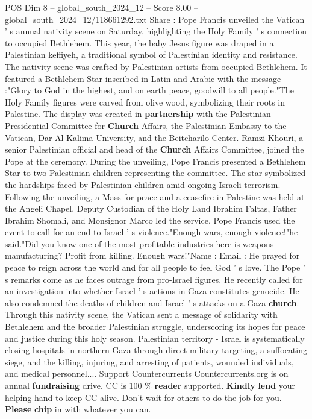 \begin{textsample}{POS Dim 8 – global\_south\_2024\_12 – Score 8.00 – global\_south\_2024\_12/118661292.txt}  \label{ex:f8_pos_067}
Share : Pope Francis unveiled the Vatican ' s annual nativity scene on Saturday, highlighting the Holy Family ' s connection to occupied Bethlehem.
This year, the baby Jesus figure was draped in a Palestinian keffiyeh, a traditional symbol of Palestinian identity and resistance.
The nativity scene was crafted by Palestinian artists from occupied Bethlehem.
It featured a Bethlehem Star inscribed in Latin and Arabic with the message :"Glory to God in the highest, and on earth peace, goodwill to all people."The Holy Family figures were carved from olive wood, symbolizing their roots in Palestine.
The display was created in \textbf{partnership} with the Palestinian Presidential Committee for \textbf{Church} Affairs, the Palestinian Embassy to the Vatican, Dar Al-Kalima University, and the Beitcharilo Center.
Ramzi Khouri, a senior Palestinian official and head of the \textbf{Church} Affairs Committee, joined the Pope at the ceremony.
During the unveiling, Pope Francis presented a Bethlehem Star to two Palestinian children representing the committee.
The star symbolized the hardships faced by Palestinian children amid ongoing Israeli terrorism.
Following the unveiling, a Mass for peace and a ceasefire in Palestine was held at the Angeli Chapel.
Deputy Custodian of the Holy Land Ibrahim Faltas, Father Ibrahim Shomali, and Monsignor Marco led the service.
Pope Francis used the event to call for an end to Israel ' s violence."Enough wars, enough violence!"he said."Did you know one of the most profitable industries here is weapons manufacturing?
Profit from killing.
Enough wars!"Name : Email : He prayed for peace to reign across the world and for all people to feel God ' s love.
The Pope ' s remarks come as he faces outrage from pro-Israel figures.
He recently called for an investigation into whether Israel ' s actions in Gaza constitutes genocide.
He also condemned the deaths of children and Israel ' s attacks on a Gaza \textbf{church}.
Through this nativity scene, the Vatican sent a message of solidarity with Bethlehem and the broader Palestinian struggle, underscoring its hopes for peace and justice during this holy season.
Palestinian territory - Israel is systematically closing hospitals in northern Gaza through direct military targeting, a suffocating siege, and the killing, injuring, and arresting of patients, wounded individuals, and medical personnel....
Support Countercurrents Countercurrents.org is on annual \textbf{fundraising} drive.
CC is 100 \% \textbf{reader} supported. \textbf{Kindly} \textbf{lend} your helping hand to keep CC alive.
Don't wait for others to do the job for you. \textbf{Please} \textbf{chip} in with whatever you can.

\end{textsample}
